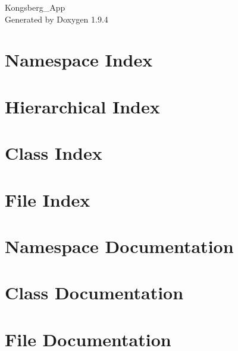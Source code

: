 \documentclass[twoside]{book}
\newcommand{\+}{\discretionary{\mbox{\scriptsize$\hookleftarrow$}}{}{}}
\newcommand{\clearemptydoublepage}{%
    \newpage{\pagestyle{empty}\cleardoublepage}%
  }
\begin{document}
  \raggedbottom
    \hypersetup{pageanchor=false,
                bookmarksnumbered=true,
                pdfencoding=unicode
               }
  \begin{titlepage}
  \vspace*{7cm}
  \begin{center}%
  {\Large Kongsberg\+\_\+\+App}\\
  \vspace*{1cm}
  {\large Generated by Doxygen 1.9.4}\\
  \end{center}
  \end{titlepage}
  \clearemptydoublepage
  \tableofcontents
  \clearemptydoublepage
  \hypersetup{pageanchor=true}
\chapter{Namespace Index}

\chapter{Hierarchical Index}

\chapter{Class Index}

\chapter{File Index}

\chapter{Namespace Documentation}



\chapter{Class Documentation}








\chapter{File Documentation}








  \backmatter
  \newpage
  \clearemptydoublepage
  \printindex
\end{document}
